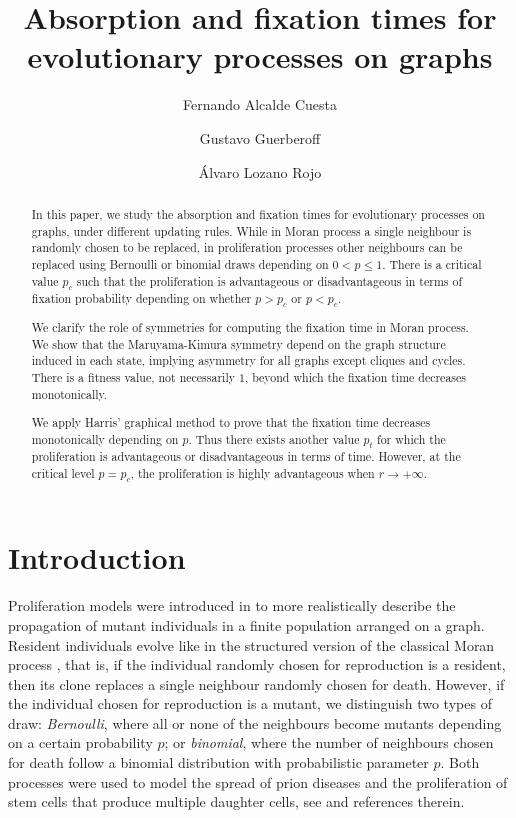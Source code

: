 \documentclass[a4paper,english,10pt]{amsart}
\title[Absorption and fixation times]{Absorption and fixation times for \\ evolutionary processes on graphs}
\author[F. Alcalde]{Fernando Alcalde Cuesta}
\author[G. Guerberoff]{Gustavo Guerberoff}
\author[\'A. Lozano]{\'Alvaro Lozano Rojo}
\theoremstyle{definition}
\numberwithin{equation}{section}
\begin{document}
\begin{abstract}
In this paper, we study the absorption and fixation times for evolutionary processes on graphs, under different updating rules. 
While in Moran process a single neighbour is randomly chosen to be replaced, in proliferation processes other neighbours can be replaced using Bernoulli or binomial draws depending on $0 < p \leq 1$. There is a critical value $p_c$ such that the proliferation is advantageous or disadvantageous in terms of fixation probability depending on whether $p > p_c$ or $p < p_c$. 

We clarify the role of symmetries for computing the fixation time in Moran process. We show that the Maruyama-Kimura symmetry depend on the graph structure induced in each state, implying asymmetry for all graphs except cliques and cycles. There is a fitness value, not necessarily $1$, beyond which the fixation time decreases monotonically. 

We apply Harris' graphical method to prove that the fixation time decreases monotonically depending on $p$. Thus there exists another value $p_t$ for which the proliferation is advantageous or disadvantageous in terms of time. However, at the critical level $p=p_c$, the proliferation is highly advantageous when $r \to +\infty$.
\end{abstract}


\maketitle
  
\section{Introduction}
\label{SIntro}

Proliferation models were introduced in \cite{AlcaldeGuerberoffLozano2022} to more realistically describe the propagation of mutant individuals in a finite population arranged on a graph. Resident individuals evolve like in the structured version \cite{LHN} of the classical Moran process \cite{Moran}, that is, if the individual randomly chosen for reproduction is a resident, then its clone replaces a single neighbour randomly chosen for death. However, if the individual chosen for reproduction is a mutant, we distinguish two types of draw: \emph{Bernoulli}, where all or none of the neighbours become mutants depending on a certain probability $p$; or \emph{binomial}, where the number of neighbours chosen for death follow a binomial distribution with probabilistic parameter $p$. Both processes were 
used to model the spread of prion diseases and the proliferation of stem cells that produce multiple daughter cells, see \cite{AlcaldeGuerberoffLozano2022} and references therein. 
\end{document}
